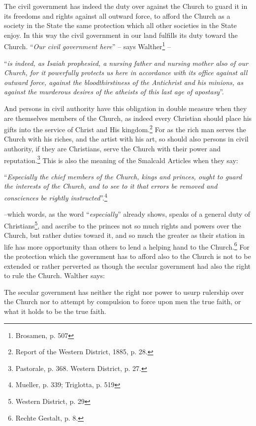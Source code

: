                 The civil government has indeed the duty over against the Church to guard it in its freedoms and rights against all outward force, to afford the Church as a society in the State the same protection which all other societies in the State enjoy.  In this way the civil government in our land fulfills its duty toward the Church.  “\textit{Our civil government here}” – says Walther\footnote{Brosamen, p. 507} – \begin{displayquote}“\textit{is indeed, as Isaiah prophesied, a nursing father and nursing mother also of our Church, for it powerfully protects us here in accordance with its office against all outward force, against the bloodthirstiness of the Antichrist and his minions, as against the murderous desires of the atheists of this last age of apostasy}”.\end{displayquote}  And persons in civil authority have this obligation in double measure when they are themselves members of the Church, as indeed every Christian should place his gifts into the service of Christ and His kingdom.\footnote{Report of the Western District, 1885, p. 28.} For as the rich man serves the Church with his riches, and the artist with his art, so should also persons in civil authority, if they are Christians, serve the Church with their power and reputation.\footnote{Pastorale, p. 368. Western District, p. 27.}  This is also the meaning of the Smalcald Articles when they say: \begin{displayquote}“\textit{Especially the chief members of the Church, kings and princes, ought to guard the interests of the Church, and to see to it that errors be removed and consciences be rightly instructed}”.\footnote{Mueller, p. 339; Triglotta, p. 519}\end{displayquote} --which words, as the word “\textit{especially}” already shows, speaks of a general duty of Christians\footnote{Western District, p. 29}, and ascribe to the princes not so much rights and powers over the Church, but rather duties toward it, and so much the greater as their station in life has more opportunity than others to lend a helping hand to the Church.\footnote{Rechte Gestalt, p. 8.}  For the protection which the government has to afford also to the Church is not to be extended or rather perverted as though the secular government had also the right to rule the Church.  Walther says: \begin{fancyquotes}The secular government has neither the right nor power to usurp rulership over the Church nor to attempt by compulsion to force upon men the true faith, or what it holds to be the true faith.


\end{fancyquotes}
